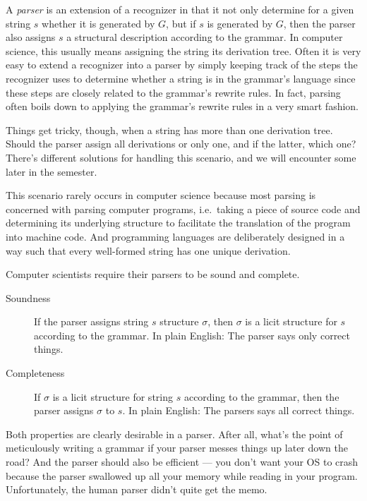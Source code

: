 A \emph{parser} is an extension of a recognizer in that it not only determine for a given string $s$ whether it is generated by $G$, but if $s$ is generated by $G$, then the parser also assigns $s$ a structural description according to the grammar.
In computer science, this usually means assigning the string its derivation tree.
Often it is very easy to extend a recognizer into a parser by simply keeping track of the steps the recognizer uses to determine whether a string is in the grammar's language since these steps are closely related to the grammar's rewrite rules.
In fact, parsing often boils down to applying the grammar's rewrite rules in a very smart fashion.

Things get tricky, though, when a string has more than one derivation tree.
Should the parser assign all derivations or only one, and if the latter, which one?
There's different solutions for handling this scenario, and we will encounter some later in the semester.

\begin{remark}
    This scenario rarely occurs in computer science because most parsing is concerned with parsing computer programs, i.e.\ taking a piece of source code and determining its underlying structure to facilitate the translation of the program into machine code.
    And programming languages are deliberately designed in a way such that every well-formed string has one unique derivation.
\end{remark}

Computer scientists require their parsers to be sound and complete.
%
\begin{description}
    \item[Soundness] If the parser assigns string $s$ structure $\sigma$, then $\sigma$ is a licit structure for $s$ according to the grammar.
        In plain English: The parser says only correct things.
    \item[Completeness] If $\sigma$ is a licit structure for string $s$ according to the grammar, then the parser assigns $\sigma$ to $s$.
        In plain English: The parsers says all correct things.
\end{description}
%
Both properties are clearly desirable in a parser.
After all, what's the point of meticulously writing a grammar if your parser messes things up later down the road?
And the parser should also be efficient --- you don't want your OS to crash because the parser swallowed up all your memory while reading in your program.
Unfortunately, the human parser didn't quite get the memo.

